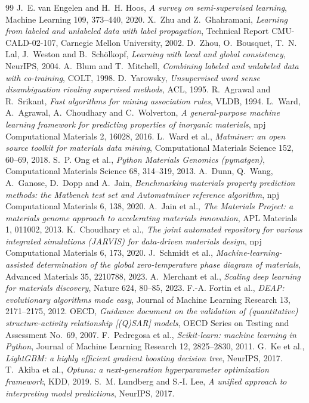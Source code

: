\begin{thebibliography}{99}
 J.~E. van Engelen and H.~H. Hoos, \emph{A survey on semi-supervised
learning}, Machine Learning 109, 373--440, 2020.
 X.~Zhu and Z.~Ghahramani, \emph{Learning from labeled and unlabeled data with
label propagation}, Technical Report CMU-CALD-02-107, Carnegie Mellon University, 2002.
 D.~Zhou, O.~Bousquet, T.~N. Lal, J.~Weston and B.~Sch\"olkopf, \emph{Learning
with local and global consistency}, NeurIPS, 2004.
 A.~Blum and T.~Mitchell, \emph{Combining labeled and unlabeled data with
co-training}, COLT, 1998.
 D.~Yarowsky, \emph{Unsupervised word sense disambiguation rivaling
supervised methods}, ACL, 1995.
 R.~Agrawal and R.~Srikant, \emph{Fast algorithms for mining association
rules}, VLDB, 1994.
 L.~Ward, A.~Agrawal, A.~Choudhary and C.~Wolverton, \emph{A general-purpose
machine learning framework for predicting properties of inorganic materials}, npj
Computational Materials 2, 16028, 2016.
 L.~Ward et al., \emph{Matminer: an open source toolkit for materials data
mining}, Computational Materials Science 152, 60--69, 2018.
 S.~P. Ong et al., \emph{Python Materials Genomics (pymatgen)}, Computational
Materials Science 68, 314--319, 2013.
 A.~Dunn, Q.~Wang, A.~Ganose, D.~Dopp and A.~Jain, \emph{Benchmarking
materials property prediction methods: the Matbench test set and Automatminer reference
algorithm}, npj Computational Materials 6, 138, 2020.
 A.~Jain et al., \emph{The Materials Project: a materials genome approach to
accelerating materials innovation}, APL Materials 1, 011002, 2013.
 K.~Choudhary et al., \emph{The joint automated repository for various
integrated simulations (JARVIS) for data-driven materials design}, npj Computational
Materials 6, 173, 2020.
 J.~Schmidt et al., \emph{Machine-learning-assisted determination of the
global zero-temperature phase diagram of materials}, Advanced Materials 35, 2210788, 2023.
 A.~Merchant et al., \emph{Scaling deep learning for materials discovery},
Nature 624, 80--85, 2023.
 F.-A. Fortin et al., \emph{DEAP: evolutionary algorithms made easy}, Journal of
Machine Learning Research 13, 2171--2175, 2012.
 OECD, \emph{Guidance document on the validation of (quantitative)
structure-activity relationship [(Q)SAR] models}, OECD Series on Testing and Assessment
No.~69, 2007.
 F.~Pedregosa et al., \emph{Scikit-learn: machine learning in Python},
Journal of Machine Learning Research 12, 2825--2830, 2011.
 G.~Ke et al., \emph{LightGBM: a highly efficient gradient boosting decision
tree}, NeurIPS, 2017.
 T.~Akiba et al., \emph{Optuna: a next-generation hyperparameter optimization
framework}, KDD, 2019.
 S.~M. Lundberg and S.-I. Lee, \emph{A unified approach to interpreting model
predictions}, NeurIPS, 2017.
\end{thebibliography}
